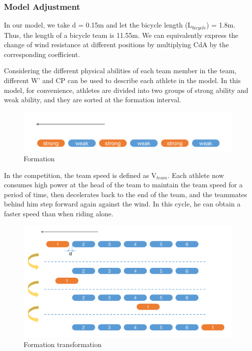 \documentclass{mcmthesis}
\begin{document}
\subsubsection{Model Adjustment}
\par
In our model, we take d = 0.15m and let the bicycle length (L$_{bicycle}$) = 1.8m. Thus, the length of a bicycle team is 11.55m. We can equivalently express the change of wind resistance at different positions by multiplying CdA by the corresponding coefficient.
\par
Considering the different physical abilities of each team member in the team, different W' and CP can be used to describe each athlete in the model. In this model, for convenience, athletes are divided into two groups of strong ability and weak ability, and they are sorted at the formation interval.
\begin{figure}[H]
\small
\centering
\includegraphics[width=14cm]{mcmthesis/figures/formation.png}
\caption{Formation} 
\end{figure}
\par
In the competition, the team speed is defined as V$_{team}$. Each athlete now consumes high power at the head of the team to maintain the team speed for a period of time, then decelerates back to the end of the team, and the teammates behind him step forward again against the wind. In this cycle, he can obtain a faster speed than when riding alone.

\begin{figure}[H]
\small
\centering
\includegraphics[width=14cm]{mcmthesis/figures/team change.png}
\caption{Formation transformation} 
\end{figure}
\end{document}
